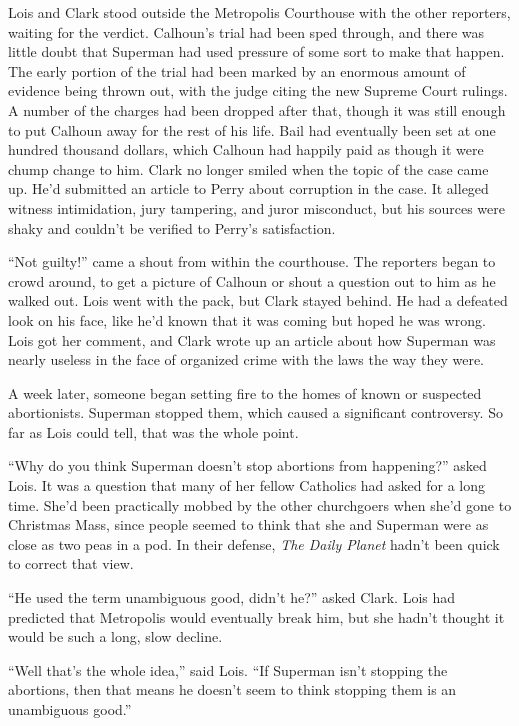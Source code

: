 \documentclass[ebook,12pt]{memoir}
\begin{document}
Lois and Clark stood outside the Metropolis Courthouse with the other
reporters, waiting for the verdict. Calhoun's trial had been sped
through, and there was little doubt that Superman had used pressure of
some sort to make that happen. The early portion of the trial had been
marked by an enormous amount of evidence being thrown out, with the
judge citing the new Supreme Court rulings. A number of the charges had
been dropped after that, though it was still enough to put Calhoun away
for the rest of his life. Bail had eventually been set at one hundred
thousand dollars, which Calhoun had happily paid as though it were chump
change to him. Clark no longer smiled when the topic of the case came
up. He'd submitted an article to Perry about corruption in the case. It
alleged witness intimidation, jury tampering, and juror misconduct, but
his sources were shaky and couldn't be verified to Perry's satisfaction.

``Not guilty!'' came a shout from within the courthouse. The reporters
began to crowd around, to get a picture of Calhoun or shout a question
out to him as he walked out. Lois went with the pack, but Clark stayed
behind. He had a defeated look on his face, like he'd known that it was
coming but hoped he was wrong. Lois got her comment, and Clark wrote up
an article about how Superman was nearly useless in the face of
organized crime with the laws the way they were.

A week later, someone began setting fire to the homes of known or
suspected abortionists. Superman stopped them, which caused a
significant controversy. So far as Lois could tell, that was the whole
point.

``Why do you think Superman doesn't stop abortions from happening?''
asked Lois. It was a question that many of her fellow Catholics had
asked for a long time. She'd been practically mobbed by the other
churchgoers when she'd gone to Christmas Mass, since people seemed to
think that she and Superman were as close as two peas in a pod. In their
defense, \emph{The Daily Planet} hadn't been quick to correct that view.

``He used the term unambiguous good, didn't he?'' asked Clark. Lois had
predicted that Metropolis would eventually break him, but she hadn't
thought it would be such a long, slow decline.

``Well that's the whole idea,'' said Lois. ``If Superman isn't stopping
the abortions, then that means he doesn't seem to think stopping them is
an unambiguous good.''
\end{document}
